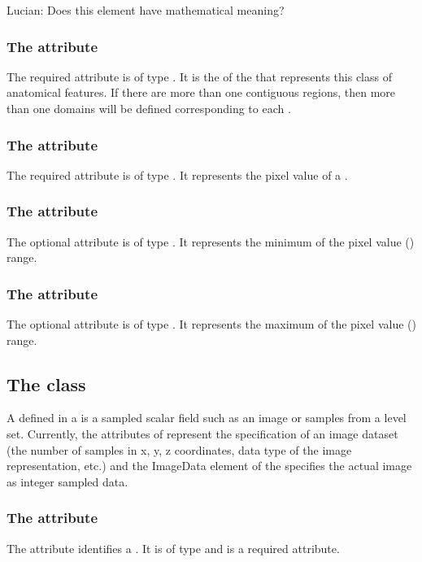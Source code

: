 {\color{red} Lucian: \notice Does this element have mathematical meaning?}

\subsubsection{The  attribute}
The required  attribute is of type . It is the  of the \DomainType that represents this class of anatomical features. If there are more than one contiguous regions, then more than one domains will be defined corresponding to each \SampledVolume.

\subsubsection{The  attribute}
The required  attribute is of type . It represents the pixel value of a \SampledVolume.

\subsubsection{The  attribute}
The optional  attribute is of type . It represents the minimum of the pixel value () range.

\subsubsection{The  attribute}
The optional  attribute is of type . It represents the maximum of the pixel value () range.


\subsection{The  class}
\label{SampledField-class}
A \SampledField defined in a \SampledFieldGeometry is a sampled scalar field such as an image or samples from a level set. Currently, the attributes of \SampledField represent the specification of an image dataset (the number of samples in x, y, z coordinates, data type of the image representation, etc.) and the ImageData element of the \SampledField specifies the actual image as integer sampled data.

\subsubsection{The  attribute}
The  attribute identifies a \SampledField. It is of type  and is a required attribute.

